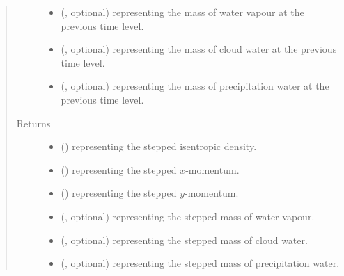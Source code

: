 \documentclass[letterpaper,10pt,english]{sphinxmanual}
\begin{document}
\begin{fulllineitems}
\begin{fulllineitems}
\begin{quote}
\begin{description}
\begin{itemize}
\item {} 
 (, optional) \textendash{}  representing the mass of water vapour at the previous time level.

\item {} 
 (, optional) \textendash{}  representing the mass of cloud water at the previous time level.

\item {} 
 (, optional) \textendash{}  representing the mass of precipitation water at the previous time level.

\end{itemize}

\item[{Returns}] \leavevmode
\begin{itemize}
\item {} 
 () \textendash{}  representing the stepped isentropic density.

\item {} 
 () \textendash{}  representing the stepped \(x\)-momentum.

\item {} 
 () \textendash{}  representing the stepped \(y\)-momentum.

\item {} 
 (, optional) \textendash{}  representing the stepped mass of water vapour.

\item {} 
 (, optional) \textendash{}  representing the stepped mass of cloud water.

\item {} 
 (, optional) \textendash{}  representing the stepped mass of precipitation water.

\end{itemize}


\end{description}\end{quote}


\end{fulllineitems}
\end{fulllineitems}
\end{document}
